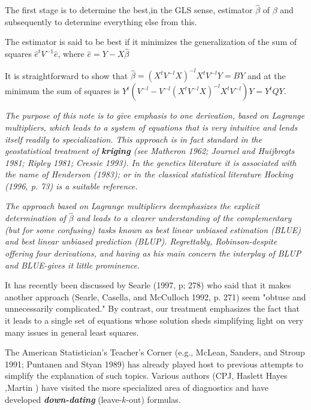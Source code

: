 \documentclass[12pt, a4paper]{article}
\begin{document}
The first stage is to determine the best,in the GLS sense, estimator $\hat{\beta}$ of $\beta$ and subsequently to determine everything else from this.

The estimator is said to be best if it minimizes the generalization of the sum of squares $\hat{e}^{t}V^{-1}\hat{e}$, where $\hat{e} = Y- X\hat{\beta}$

\newpage

It is straightforward to show that $\hat{\beta} = (X^tV^{-l}X)^{-l}X^tV^{-l}Y = BY$ and at the minimum the sum of squares is $Y^{t} (V^{-l}  - V^{-l}(X^tV^{-l}X)^{-l}X^tV^{-l})Y = Y^{t}QY$.\\
\bigskip

\emph{The purpose of this note is to give emphasis to one derivation, based on Lagrange multipliers, which leads to a system of equations that is very intuitive and lends itself readily to specialization. This approach is in fact standard in the geostatistical treatment of \textbf{kriging} (see Matheron 1962; Journel and Huijbregts 1981; Ripley 1981; Cressie 1993). In the genetics literature it is associated with the name of Henderson (1983); or in the classical statistical literature Hocking (1996, p. 73) is a suitable reference.}

\emph{The approach based on Lagrange multipliers deemphasizes the explicit determination of $\hat{\beta}$ and leads to a clearer understanding of the complementary (but for some confusing) tasks known as best linear unbiased estimation (BLUE) and best linear unbiased prediction (BLUP). Regrettably, Robinson-despite offering four derivations, and having as his main concern the interplay of BLUP and BLUE-gives it little prominence.}

It has recently been discussed by Searle (1997, p; 278) who said that it makes another approach (Searle, Casella, and McCulloch 1992, p. 271) seem "obtuse and unnecessarily complicated." By contrast, our treatment emphasizes the fact that it leads to a single set of equations whose solution sheds simplifying light on very many issues in general least squares.

The American Statistician's Teacher's Corner (e.g., McLean, Sanders, and Stroup 1991; Puntanen and Styan 1989) has already played host to previous attempts to simplify the explanation of such topics. Various authors (CPJ, Haslett Hayes ,Martin ) have visited the more specialized area of diagnostics and have developed \textbf{\emph{down-dating}} (leave-$k$-out) formulas.
\end{document}
